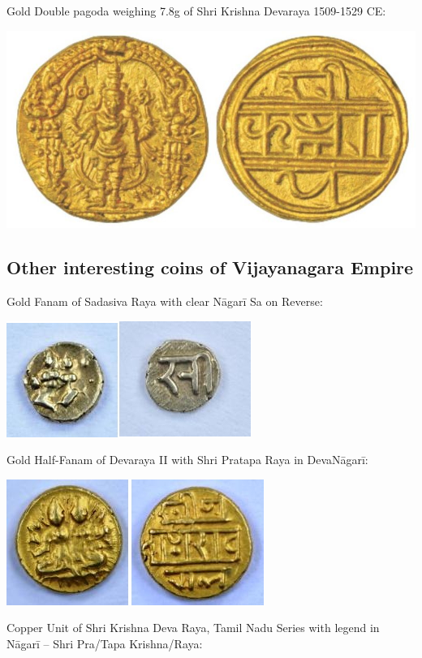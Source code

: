 Gold Double pagoda weighing 7.8g of Shri Krishna Devaraya 1509-1529 CE:

\centerline{\includegraphics[scale=0.37]{"images/article-06/art06-fig20.jpg"}}


\subsection*{Other interesting coins of Vijayanagara Empire}

Gold Fanam of Sadasiva Raya with clear Nāgarī Sa on Reverse:

\vskip 4pt

\centerline{\includegraphics[scale=0.6]{"images/article-06/art06-fig21.jpg"}}

Gold Half-Fanam of Devaraya II with Shri Pratapa Raya in DevaNāgarī:

\vskip 4pt

\centerline{\includegraphics[scale=0.6]{"images/article-06/art06-fig22.jpg"}}

Copper Unit of Shri Krishna Deva Raya, Tamil Nadu Series with legend in Nāgarī – Shri Pra/Tapa Krishna/Raya:

